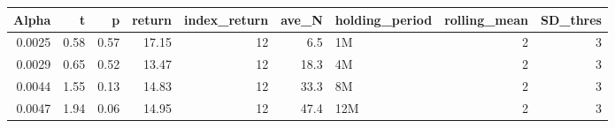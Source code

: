 \begin{table}[ht]
\centering
\begin{tabular}{rrrrrrlrr}
  \hline
Alpha & t & p & return & index\_return & ave\_N & holding\_period & rolling\_mean & SD\_thres \\ 
  \hline
0.0025 & 0.58 & 0.57 & 17.15 & 12 & 6.5 & 1M &  2 &  3 \\ 
  0.0029 & 0.65 & 0.52 & 13.47 & 12 & 18.3 & 4M &  2 &  3 \\ 
  0.0044 & 1.55 & 0.13 & 14.83 & 12 & 33.3 & 8M &  2 &  3 \\ 
  0.0047 & 1.94 & 0.06 & 14.95 & 12 & 47.4 & 12M &  2 &  3 \\ 
   \hline
\end{tabular}
\end{table}

